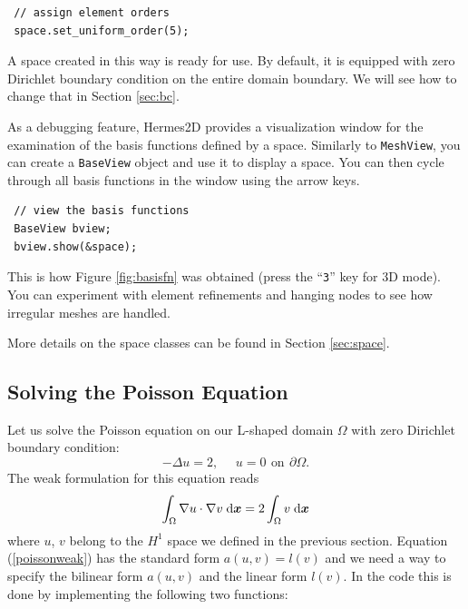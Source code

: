 \begin{lstlisting}
 // assign element orders
 space.set_uniform_order(5);
\end{lstlisting}

A space created in this way is ready for use. By default, it is equipped with
zero Dirichlet boundary condition on the entire domain boundary. We will see
how to change that in Section \ref{sec:bc}.

As a debugging feature, Hermes2D provides a visualization window for the
examination of the basis functions defined by a space. Similarly to {\tt MeshView},
you can create a {\tt BaseView} object and use it to display a space.
You can then cycle through all basis functions in the window using the arrow keys.

\begin{lstlisting}
 // view the basis functions
 BaseView bview;
 bview.show(&space);
\end{lstlisting}

This is how Figure \ref{fig:basisfn} was obtained (press the ``{\tt 3}'' key for 3D mode).
You can experiment with element refinements and hanging nodes to see how
irregular meshes are handled.

More details on the space classes can be found in Section \ref{sec:space}.



\subsection{Solving the Poisson Equation}
\label{sec:poisson}

Let us solve the Poisson equation on our L-shaped domain $\Omega$ with zero Dirichlet boundary
condition:
$$-\Delta u = 2,\ \ \ \ \ \ u = 0\,\ \mbox{on}\,\ \partial \Omega.$$
The weak formulation  for this equation reads
\begin{equation} \label{poissonweak}
  \int_\Omega \nabla u \cdot \nabla v \;\mbox{d\mbox{\boldmath $x$}} = 2 \int_\Omega v \;\mbox{d\mbox{\boldmath $x$}}
\end{equation}
where $u$, $v$ belong to the $H^1$ space we defined in the previous section.
Equation (\ref{poissonweak}) has the standard form $a(u,v) = l(v)$ and we need
a way to specify the bilinear form $a(u,v)$ and the linear form $l(v)$.
 
In the code this is done by implementing the following two functions:

